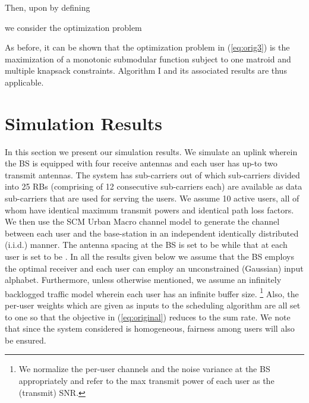 \documentclass[11pt] {article}
\begin{document}
Then, upon by defining

 we consider the optimization problem
 
  As before, it can be shown that the optimization problem in (\ref{eq:orig3}) is the maximization of a monotonic submodular   function subject to one matroid and multiple knapsack constraints. Algorithm I and its associated results are thus applicable.





\section{Simulation Results}


In this section we present our simulation results.
We simulate an uplink  wherein the BS is equipped with four receive antennas and each user has up-to two transmit antennas.  The system has  sub-carriers out of which   sub-carriers  divided into 25 RBs (comprising of 12 consecutive sub-carriers each) are available as  data sub-carriers that are used for serving the users.
  We assume 10 active users, all of whom have identical maximum transmit powers and identical path loss factors. We then use the SCM Urban Macro channel model \cite{3gpp}  to  generate the channel between each user and the base-station in an independent identically distributed (i.i.d.) manner. The antenna spacing at the BS is set to be  while that at each user is set to be . In all the results given below  we assume that the BS employs the optimal receiver and each user can employ an unconstrained (Gaussian) input alphabet. Furthermore, unless otherwise mentioned, we assume an infinitely backlogged traffic model wherein each user has an infinite buffer size.  \footnote{We normalize the per-user channels and the noise variance at the BS appropriately and refer to the max transmit power of each user as the (transmit) SNR.} Also, the  per-user weights which are given as inputs to the scheduling algorithm are all set to one so that the objective in (\ref{eq:original}) reduces to the sum rate. We note that since the system considered is homogeneous, fairness among users will also be ensured.
\end{document}
